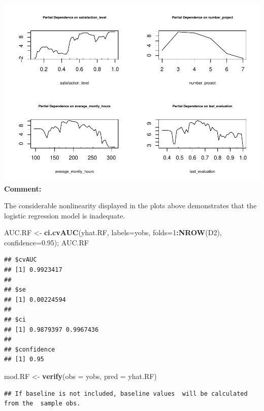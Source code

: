 \documentclass[
  11pt,
]{article}
\newenvironment{Shaded}{\begin{snugshade}}{\end{snugshade}}
\newcommand{\AttributeTok}[1]{\textcolor[rgb]{0.13,0.29,0.53}{#1}}
\newcommand{\DecValTok}[1]{\textcolor[rgb]{0.00,0.00,0.81}{#1}}
\newcommand{\FloatTok}[1]{\textcolor[rgb]{0.00,0.00,0.81}{#1}}
\newcommand{\FunctionTok}[1]{\textcolor[rgb]{0.13,0.29,0.53}{\textbf{#1}}}
\newcommand{\NormalTok}[1]{#1}
\newcommand{\OtherTok}[1]{\textcolor[rgb]{0.56,0.35,0.01}{#1}}
\newcommand{\SpecialCharTok}[1]{\textcolor[rgb]{0.81,0.36,0.00}{\textbf{#1}}}
\begin{document}
\includegraphics[width=0.9\linewidth]{OWUSU_project_files/figure-latex/unnamed-chunk-28-1}\\
\textbf{Comment:}

The considerable nonlinearity displayed in the plots above demonstrates
that the logistic regression model is inadequate.

\begin{Shaded}
\begin{Highlighting}[]
\NormalTok{AUC.RF }\OtherTok{\textless{}{-}} \FunctionTok{ci.cvAUC}\NormalTok{(yhat.RF, }\AttributeTok{labels=}\NormalTok{yobs, }\AttributeTok{folds=}\DecValTok{1}\SpecialCharTok{:}\FunctionTok{NROW}\NormalTok{(D2),}
                \AttributeTok{confidence=}\FloatTok{0.95}\NormalTok{); AUC.RF}
\end{Highlighting}
\end{Shaded}

\begin{verbatim}
## $cvAUC
## [1] 0.9923417
## 
## $se
## [1] 0.00224594
## 
## $ci
## [1] 0.9879397 0.9967436
## 
## $confidence
## [1] 0.95
\end{verbatim}

\begin{Shaded}
\begin{Highlighting}[]
\NormalTok{mod.RF }\OtherTok{\textless{}{-}} \FunctionTok{verify}\NormalTok{(}\AttributeTok{obs =}\NormalTok{ yobs, }\AttributeTok{pred =}\NormalTok{ yhat.RF)}
\end{Highlighting}
\end{Shaded}

\begin{verbatim}
## If baseline is not included, baseline values  will be calculated from the  sample obs.
\end{verbatim}
\end{document}
